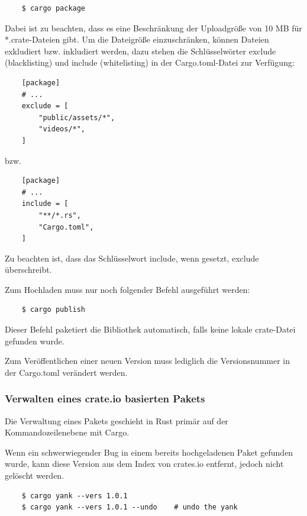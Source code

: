 \begin{lstlisting}
    $ cargo package
\end{lstlisting}

Dabei ist zu beachten, dass es eine Beschränkung der Uploadgröße von 10 MB für *.crate-Dateien gibt. Um die Dateigröße einzuschränken, können Dateien exkludiert bzw. inkludiert werden, dazu stehen die Schlüsselwörter \glqq exclude\grqq{} (blacklisting) und \glqq include\grqq{} (whitelisting) in der Cargo.toml-Datei zur Verfügung:

\begin{lstlisting}
    [package]
    # ...
    exclude = [
        "public/assets/*",
        "videos/*",
    ]
\end{lstlisting}

bzw.

\begin{lstlisting}
    [package]
    # ...
    include = [
        "**/*.rs",
        "Cargo.toml",
    ]
\end{lstlisting}

Zu beachten ist, dass das Schlüsselwort \glqq include\grqq{}, wenn gesetzt, \glqq exclude\grqq{} überschreibt.

Zum Hochladen muss nur noch folgender Befehl ausgeführt werden:

\begin{lstlisting}
    $ cargo publish
\end{lstlisting}

Dieser Befehl paketiert die Bibliothek automatisch, falls keine lokale crate-Datei gefunden wurde.

Zum Veröffentlichen einer neuen Version muss lediglich die Versionsnummer in der Cargo.toml verändert werden.

\subsubsection{Verwalten eines crate.io basierten Pakets}

Die Verwaltung eines Pakets geschieht in Rust primär auf der Kommandozeilenebene mit Cargo.

Wenn ein schwerwiegender Bug in einem bereits hochgeladenen Paket gefunden wurde, kann diese Version aus dem Index von crates.io entfernt, jedoch nicht gelöscht werden.

\begin{lstlisting}
    $ cargo yank --vers 1.0.1
    $ cargo yank --vers 1.0.1 --undo    # undo the yank
\end{lstlisting}

